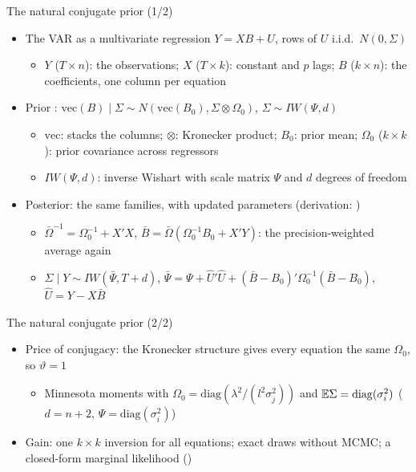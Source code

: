 \begin{frame}{The natural conjugate prior (1/2)}
\itemsize{\small}
\begin{itemize}
    \item The VAR as a multivariate regression $Y = XB + U$, rows of $U$ i.i.d.\ $N(0, \Sigma)$
    \begin{itemize}
        \item $Y$ ($T\times n$): the observations; $X$ ($T\times k$): constant and $p$ lags; $B$ ($k\times n$): the coefficients, one column per equation
    \end{itemize}
    \item Prior : $\mathrm{vec}(B)\mid\Sigma \sim N(\mathrm{vec}(B_0), \Sigma\otimes\Omega_0)$, $\Sigma \sim IW(\Psi, d)$
    \begin{itemize}
        \item $\mathrm{vec}$: stacks the columns; $\otimes$: Kronecker product; $B_0$: prior mean; $\Omega_0$ ($k\times k$): prior covariance across regressors
        \item $IW(\Psi, d)$: inverse Wishart with scale matrix $\Psi$ and $d$ degrees of freedom
    \end{itemize}
    \item Posterior: the same families, with updated parameters (derivation: )  %
    \begin{itemize}
        \item $\bar\Omega^{-1} = \Omega_0^{-1} + X'X$, $\bar B = \bar\Omega(\Omega_0^{-1}B_0 + X'Y)$: the precision-weighted average again
        \item $\Sigma\mid Y \sim IW(\bar\Psi, T + d)$, $\bar\Psi = \Psi + \hat U'\hat U + (\bar B - B_0)'\Omega_0^{-1}(\bar B - B_0)$, $\hat U = Y - X\bar B$
    \end{itemize}
\end{itemize}
\end{frame}

\begin{frame}{The natural conjugate prior (2/2)}
\itemsize{\small}
\begin{itemize}
    \item Price of conjugacy: the Kronecker structure gives every equation the same $\Omega_0$, so $\vartheta = 1$
    \begin{itemize}
        \item Minnesota moments with $\Omega_0 = \mathrm{diag}(\lambda^2/(l^2\sigma_j^2))$ and $\mathbb{E}\Sigma = \mathrm{diag}(\sigma_i^2)$ ($d = n + 2$, $\Psi = \mathrm{diag}(\sigma_i^2)$)
    \end{itemize}
    \item Gain: one $k\times k$ inversion for all equations; exact draws without MCMC; a closed-form marginal likelihood ()  %
\end{itemize}
\end{frame}

